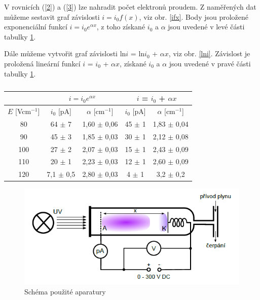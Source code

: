 \documentclass[a4paper,12pt]{article}
\begin{document}
V rovnicích (\ref{2}) a (\ref{3}) lze nahradit počet elektronů proudem. Z naměřených dat můžeme sestavit graf závislosti $i = i_0 f(x)$, viz obr. \ref{ifx}. Body jsou proložené exponenciální funkcí $i = i_0 e^{\alpha x}$, z toho získané $i_0$ a $\alpha$ jsou uvedené v levé části tabulky \ref{tab1}.

Dále můžeme vytvořit graf závislosti ln$i$ = ln$i_0$ + $\alpha x$, viz obr. \ref{lni}. Závislost je proložená lineární funkcí $i$ = $i_0$ + $\alpha x$, získané $i_0$ a $\alpha$ jsou uvedené v pravé části tabulky \ref{tab1}.

\begin{center}
	\begin{table}[h]
		\centering
		\caption{}
		\label{tab1}
		\begin{tabular}{|c|c|c|c|c|} \hline
			\multicolumn{1}{|c|}{}  & \multicolumn{2}{c|}{$i = i_0 e^{\alpha x}$}& \multicolumn{2}{c|}{$i$ = $i_0$ + $\alpha x$}  \\ \hline
			$E$ [Vcm$^{-1}$] & $i_0$ [pA] & $\alpha$ [cm$^{-1}$] & $i_0$ [pA] & $\alpha$ [cm$^{-1}$] \\ \hline
			80 & 64 $\pm$ 7 & 1,60 $\pm$ 0,06 & 45 $\pm$ 1 & 1,83 $\pm$ 0,04\\ \hline
			90 & 45 $\pm$ 3 & 1,85 $\pm$ 0,03& 30 $\pm$ 1 & 2,12 $\pm$ 0,08\\ \hline
			100 & 27 $\pm$ 2 & 2,07 $\pm$ 0,03 & 15 $\pm$ 1 & 2,43 $\pm$ 0,09\\ \hline
			110 & 20 $\pm$ 1 & 2,23 $\pm$ 0,03 & 12 $\pm$ 1 & 2,60 $\pm$ 0,09 \\ \hline
			120 & 7,1 $\pm$ 0,5 & 2,80 $\pm$ 0,03 & 4 $\pm$ 1 & 3,2 $\pm$ 0,2 \\ \hline
			
		\end{tabular}
	\end{table}
\end{center}


\begin{figure}[h]
	\centering
	\includegraphics[width=130mm]{aparatura.png}
	\caption{Schéma použité aparatury}
	\label{aparatura}
\end{figure}
\end{document}
